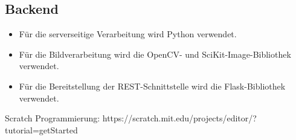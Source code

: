 \documentclass[conference]{IEEEtran}
\begin{document}
\subsection{Backend}
\begin{itemize}
	\item Für die serverseitige Verarbeitung wird Python verwendet. 
	\item Für die Bildverarbeitung wird die OpenCV- und SciKit-Image-Bibliothek verwendet. 
	\item Für die Bereitstellung der REST-Schnittstelle wird die Flask-Bibliothek verwendet.
\end{itemize}

\begin{thebibliography}{00}
	 Scratch Programmierung: https://scratch.mit.edu/projects/editor/?tutorial=getStarted
\end{thebibliography}
\vspace{12pt}
\end{document}
